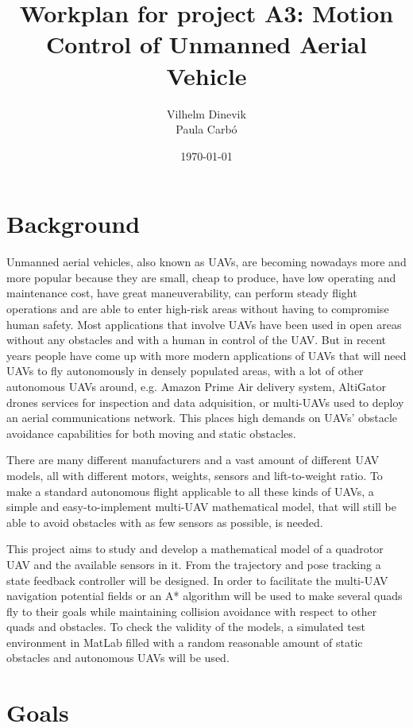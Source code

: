\documentclass{article}
\title{Workplan for project A3: Motion Control of Unmanned Aerial Vehicle}
\author{Vilhelm Dinevik \\ Paula Carbó}
\date{\today}
\begin{document}
	\maketitle
	
	\bigskip
	\section{Background}
		Unmanned aerial vehicles, also known as UAVs, are becoming nowadays more and more popular because they are small, cheap to produce, have low operating and maintenance cost, have great maneuverability, can perform steady flight operations and are able to enter high-risk areas without having to compromise human safety. Most applications that involve UAVs have been used in open areas without any obstacles and with a human in control of the UAV. But in recent years people have come up with more modern applications of UAVs that will need UAVs to fly autonomously in densely populated areas, with a lot of other autonomous UAVs around, e.g. Amazon Prime Air delivery system, AltiGator drones services for inspection and data adquisition, or multi-UAVs used to deploy an aerial communications network. This places high demands on UAVs’ obstacle avoidance capabilities for both moving and static obstacles.
		
		\vspace{1em}
		There are many different manufacturers and a vast amount of different UAV models, all with different motors, weights, sensors and lift-to-weight ratio. To make a standard autonomous flight applicable to all these kinds of UAVs, a simple and easy-to-implement multi-UAV mathematical model, that will still be able to avoid obstacles with as few sensors as possible, is needed.  
		
		\vspace{1em}
		This project aims to study and develop a mathematical model of a quadrotor UAV and the available sensors in it.  From the trajectory and pose tracking a state feedback controller will be designed. In order to facilitate the multi-UAV navigation potential fields or an A* algorithm will be used to make several quads fly to their goals while maintaining collision avoidance with respect to other quads and obstacles. To check the validity of the models, a simulated test environment in MatLab filled with a random reasonable amount of static obstacles and autonomous UAVs will be used.



	\section{Goals}
\end{document}
